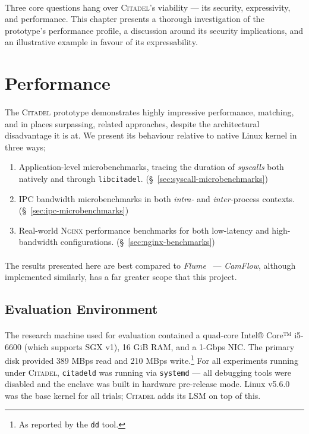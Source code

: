 \paragraph{} Three core questions hang over \textsc{Citadel}'s viability --- its security, expressivity, and performance. This chapter presents a thorough investigation of the prototype's performance profile, a discussion around its security implications, and an illustrative example in favour of its expressability.

\section{Performance}
\label{sec:performance}

\paragraph{} The \textsc{Citadel} prototype demonstrates highly impressive performance, matching, and in places surpassing, related approaches, despite the architectural disadvantage it is at. We present its behaviour relative to native Linux kernel in three ways;

\begin{enumerate}
    \item Application-level microbenchmarks, tracing the duration of \textit{syscalls} both natively and through \texttt{libcitadel}. (§~\ref{sec:syscall-microbenchmarks})
    \item IPC bandwidth microbenchmarks in both \textit{intra-} and \textit{inter-}process contexts. (§~\ref{sec:ipc-microbenchmarks})
    \item Real-world \textsc{Nginx} performance benchmarks for both low-latency and high-bandwidth configurations. (§~\ref{sec:nginx-benchmarks})
\end{enumerate}

\paragraph{}The results presented here are best compared to \textit{Flume}~\cite{flume} --- \textit{CamFlow}, although implemented similarly, has a far greater scope that this project.

\subsection{Evaluation Environment}
\paragraph{} The research machine used for evaluation contained a quad-core Intel® Core™ i5-6600 (which supports SGX v1), 16 GiB RAM, and a 1-Gbps NIC. The primary disk provided 389 MBps read and 210 MBps write.\footnote{As reported by the \texttt{dd} tool.} For all experiments running under \textsc{Citadel}, \texttt{citadeld} was running via \texttt{systemd} --- all debugging tools were disabled and the enclave was built in hardware pre-release mode. Linux v5.6.0 was the base kernel for all trials; \textsc{Citadel} adds its LSM on top of this.

